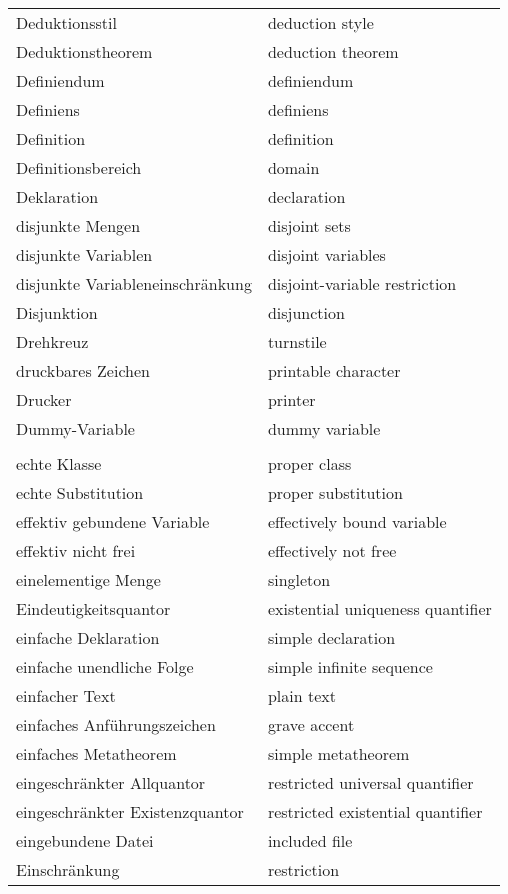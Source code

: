 \begin{longtabu}   { @{} X[l] X[l] }
    Deduktionsstil & deduction style \\
    Deduktionstheorem & deduction theorem \\
    Definiendum & definiendum \\
    Definiens & definiens \\
    Definition & definition \\
    Definitionsbereich & domain \\
    Deklaration & declaration \\
    disjunkte Mengen & disjoint sets \\
    disjunkte Variablen & disjoint variables \\
    disjunkte Variableneinschränkung & disjoint-{\allowbreak}variable restriction \\
    Disjunktion & disjunction \\
    Drehkreuz & turnstile \\
    druckbares Zeichen & printable character \\
    Drucker & printer \\
    Dummy-Variable & dummy variable \\
     & \\
    echte Klasse & proper class \\
    echte Substitution & proper substitution \\
    effektiv gebundene Variable & effectively bound variable \\
    effektiv nicht frei & effectively not free \\
    einelementige Menge & singleton \\
    Eindeutigkeitsquantor & existential uniqueness quantifier \\
    einfache Deklaration & simple declaration \\
    einfache unendliche Folge & simple infinite sequence \\
    einfacher Text & plain text \\
    einfaches Anführungszeichen & grave accent \\
    einfaches Metatheorem & simple metatheorem \\
    eingeschränkter Allquantor & restricted universal quantifier \\
    eingeschränkter Existenzquantor & restricted existential quantifier \\
    eingebundene Datei & included file \\
    Einschränkung & restriction \\

\end{longtabu}
